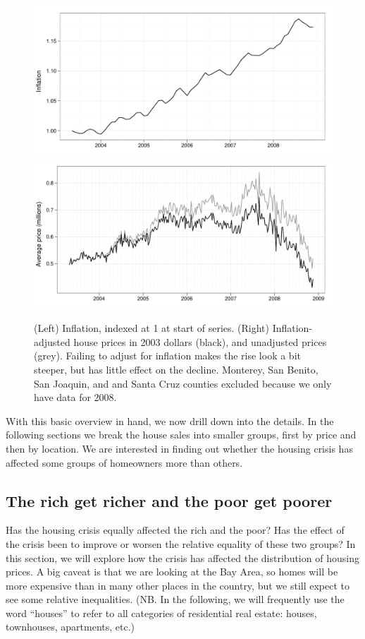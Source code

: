 \documentclass[oneside]{article}
\begin{document}
\begin{figure}[htbp]
  \centering
    \includegraphics[width=0.5 \linewidth]{daily-cpi}%
    \includegraphics[width=0.5 \linewidth]{daily-price-adj}
  \caption{(Left) Inflation, indexed at 1 at start of series.  (Right) Inflation-adjusted house prices in 2003 dollars (black), and unadjusted prices (grey).  Failing to adjust for inflation makes the rise look a bit steeper, but has little effect on the decline. Monterey, San Benito, San Joaquin, and
and Santa Cruz counties excluded because we only have data for 2008.}
  \label{fig:inflation}
\end{figure}

With this basic overview in hand, we now drill down into the details. In the following sections we break the house sales into smaller groups, first by price and then by location.  We are interested in finding out whether the housing crisis has affected some groups of homeowners more than others.

\subsection{The rich get richer and the poor get poorer}

Has the housing crisis equally affected the rich and the poor?  Has the effect of the crisis been to improve or worsen the relative equality of these two groups?  In this section, we will explore how the crisis has affected the distribution of housing prices.  A big caveat is that we are looking at the Bay Area, so homes will be more expensive than in many other places in the country, but we still expect to see some relative inequalities.  (NB.  In the following, we will frequently use the word ``houses'' to refer to all categories of residential real estate: houses, townhouses, apartments, etc.)
\end{document}
